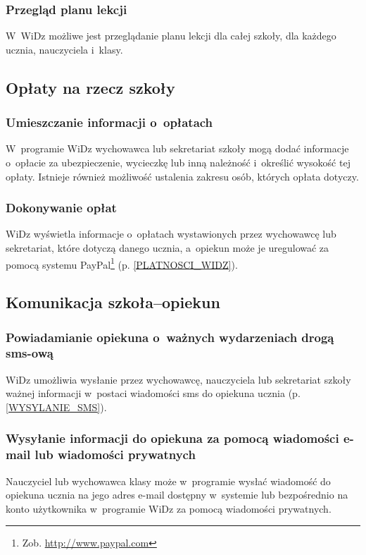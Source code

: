 \documentclass[12pt,leqno,twoside]{mwart}
\begin{document}
\subsubsection{Przegląd planu lekcji}
\noindent W~WiDz możliwe jest przeglądanie planu lekcji dla całej szkoły, dla każdego ucznia, nauczyciela i~klasy.

\subsection{Opłaty na rzecz szkoły}
\subsubsection{Umieszczanie informacji o~opłatach}
\noindent W~programie WiDz wychowawca lub sekretariat szkoły mogą dodać informacje o~opłacie za ubezpieczenie, wycieczkę lub inną należność i~określić wysokość tej opłaty. Istnieje również możliwość ustalenia zakresu osób, których opłata dotyczy.

\subsubsection{Dokonywanie opłat}
\noindent WiDz wyświetla informacje o~opłatach wystawionych przez wychowawcę lub sekretariat, które dotyczą danego ucznia, a~opiekun może je uregulować za pomocą systemu PayPal\footnote{Zob. \url{http://www.paypal.com}} (p. \ref{PLATNOSCI_WIDZ}). 

\subsection{Komunikacja szkoła--opiekun}
\subsubsection{Powiadamianie opiekuna o~ważnych wydarzeniach drogą sms-ową}
\noindent WiDz umożliwia wysłanie przez wychowawcę, nauczyciela lub sekretariat szkoły ważnej informacji w~postaci wiadomości sms do opiekuna ucznia  (p. \ref{WYSYLANIE_SMS}).

\subsubsection{Wysyłanie informacji do opiekuna za pomocą wiadomości e-mail lub wiadomości prywatnych}
\noindent Nauczyciel lub wychowawca klasy może w~programie wysłać wiadomość do opiekuna ucznia na jego adres e-mail dostępny w~systemie lub bezpośrednio na konto użytkownika w~programie WiDz za pomocą wiadomości prywatnych.
\end{document}
